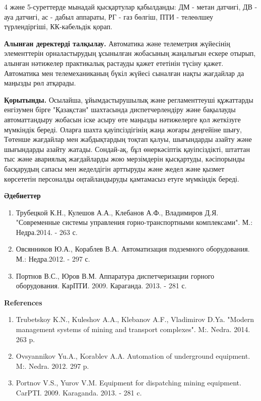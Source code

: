 \begin{multicols}{2}
4 және 5-суреттерде мынадай қысқартулар қабылданды: ДМ - метан датчигі,
ДВ - ауа датчигі, ас - дабыл аппараты, РГ - газ бөлгіш, ПТИ -
телеөлшеу түрлендіргіші, КК-кабельдік қорап.

{\bfseries Алынған деректерді талқылау.} Автоматика және телеметрия
жүйесінің элементтерін орналастырудың ұсынылған жобасының жаңалығын
ескере отырып, алынған нәтижелер практикалық растауды қажет ететінін
түсіну қажет. Автоматика мен телемеханиканың бүкіл жүйесі сыналған нақты
жағдайлар да маңызды рөл атқарады.

{\bfseries Қорытынды.} Осылайша, ұйымдастырушылық және регламенттеуші
құжаттарды енгізумен бірге "Қазақстан" шахтасында диспетчерлендіру және
бақылауды автоматтандыру жобасын іске асыру өте маңызды нәтижелерге қол
жеткізуге мүмкіндік береді. Оларға шахта қауіпсіздігінің жаңа жоғары
деңгейіне шығу, Төтенше жағдайлар мен жабдықтардың тоқтап қалуы,
шығындарды азайту және шығындарды азайту жатады. Сондай-ақ, бұл
өнеркәсіптік қауіпсіздікті, штаттан тыс және авариялық жағдайларды жою
мерзімдерін қысқартуды, кәсіпорынды басқарудың сапасы мен жеделдігін
арттыруды және жедел және қызмет көрсететін персоналды оңтайландыруды
қамтамасыз етуге мүмкіндік береді.
\end{multicols}

\begin{center}
{\bfseries Әдебиеттер}
\end{center}

\begin{enumerate}
\item
Трубецкой К.Н., Кулешов А.А., Клебанов А.Ф., Владимиров Д.Я.
"Современные системы управления горно-транспортными комплексами". М.:
Недра.2014. - 263 с.

\item
Овсянников Ю.А., Кораблев В.А. Автоматизация подземного оборудования.
М.: Недра.2012. - 297 с.

\item
Портнов В.С., Юров В.М. Аппаратура диспетчеризации горного
оборудования. КарПТИ. 2009. Караганда. 2013. - 281 с.
\end{enumerate}

\begin{center}
{\bfseries References}
\end{center}

\begin{enumerate}
\item
Trubetskoy K.N., Kuleshov A.A., Klebanov A.F., Vladimirov D.Ya.
"Modern management systems of mining and transport complexes". M:.
Nedra. 2014. 263 p.

\item
Ovsyannikov Yu.A., Korablev A.A. Automation of underground equipment.
M:. Nedra. 2012. 297 p.

\item
Portnov V.S., Yurov V.M. Equipment for dispatching mining equipment.
CarPTI. 2009. Karaganda. 2013. - 281 c.
\end{enumerate}

